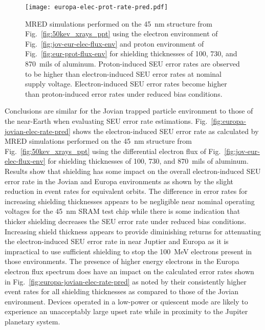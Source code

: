\begin{figure}[htbp]
    \begin{center}
        \texttt{[image: europa-elec-prot-rate-pred.pdf]}
    \end{center}
    \caption{MRED simulations performed on the 45~nm structure from Fig.~\ref{fig:50kev_xrays_ppt} using the electron environment of Fig.~\ref{fig:jov-eur-elec-flux-env} and proton environment of Fig.~\ref{fig:eur-prot-flux-env} for shielding thicknesses of 100, 730, and 870~mils of aluminum.
    Proton-induced SEU error rates are observed to be higher than electron-induced SEU error rates at nominal supply voltage. 
    Electron-induced SEU error rates become higher than proton-induced error rates under reduced bias conditions.
    }
    \label{fig:europa-elec-prot-rate-pred}
\end{figure}

Conclusions are similar for the Jovian trapped particle environment to those of the near-Earth when evaluating SEU error rate estimations.
Fig.~\ref{fig:europa-jovian-elec-rate-pred} shows the electron-induced SEU error rate as calculated by MRED simulations performed on the 45~nm structure from Fig.~\ref{fig:50kev_xrays_ppt} using the differential electron flux of Fig.~\ref{fig:jov-eur-elec-flux-env} for shielding thicknesses of 100, 730, and 870~mils of aluminum.
Results show that shielding has some impact on the overall electron-induced SEU error rate in the Jovian and Europa environments as shown by the slight reduction in event rates for equivalent orbits.
The difference in error rates for increasing shielding thicknesses appears to be negligible near nominal operating voltages for the 45~nm SRAM test chip while there is some indication that thicker shielding decreases the SEU error rate under reduced bias conditions.
Increasing shield thickness appears to provide diminishing returns for attenuating the electron-induced SEU error rate in near Juptier and Europa as it is impractical to use sufficient shielding to stop the 100~MeV electrons present in those environments.
The presence of higher energy electrons in the Europa electron flux spectrum does have an impact on the calculated error rates shown in Fig.~\ref{fig:europa-jovian-elec-rate-pred} as noted by their consistently higher event rates for all shielding thicknesses as compared to those of the Jovian environment.
Devices operated in a low-power or quiescent mode are likely to experience an unacceptably large upset rate while in proximity to the Jupiter planetary system.

